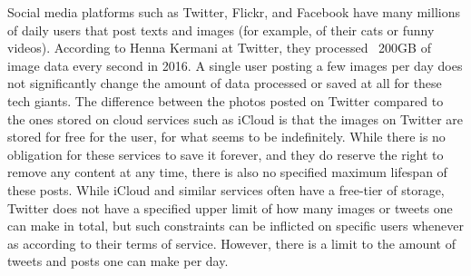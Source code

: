 Social media platforms such as Twitter, Flickr, and Facebook have many millions of daily users that post texts and images (for example, of their cats or funny videos). According to Henna Kermani at Twitter, they processed ~200GB of image data every second in 2016\cite{MobileScaleLondona}. A single user posting a few images per day does not significantly change the amount of data processed or saved at all for these tech giants. %
The difference between the photos posted on Twitter compared to the ones stored on cloud services such as iCloud is that the images on Twitter are stored for free for the user, for what seems to be indefinitely. While there is no obligation for these services to save it forever, and they do reserve the right to remove any content at any time,  %
there is also no specified maximum lifespan of these posts. While iCloud and similar services often have a free-tier of storage, Twitter does not have a specified upper limit of how many images or tweets one can make in total, but such constraints can be inflicted on specific users whenever as according to their terms of service. However, there is a limit to the amount of tweets and posts one can make per day. %